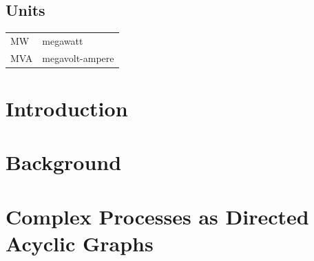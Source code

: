 \documentclass[a4paper,oneside,11pt]{book}
\def\maindoc{}
\begin{document}
\section*{Units}
\begin{tabular}{ll}
    MW      & megawatt \\
    MVA     & megavolt-ampere \\
\end{tabular}

% 

\mainmatter

\chapter{Introduction}
\label{ch:main-intro}


\chapter{Background}
\label{ch:lit-review}


\chapter{Complex Processes as Directed Acyclic Graphs}
\label{ch:system-model}

\end{document}
